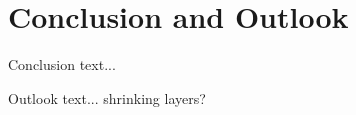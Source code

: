 \chapter{Conclusion and Outlook} \label{chap:conclusion}
Conclusion text...

Outlook text...
shrinking layers?